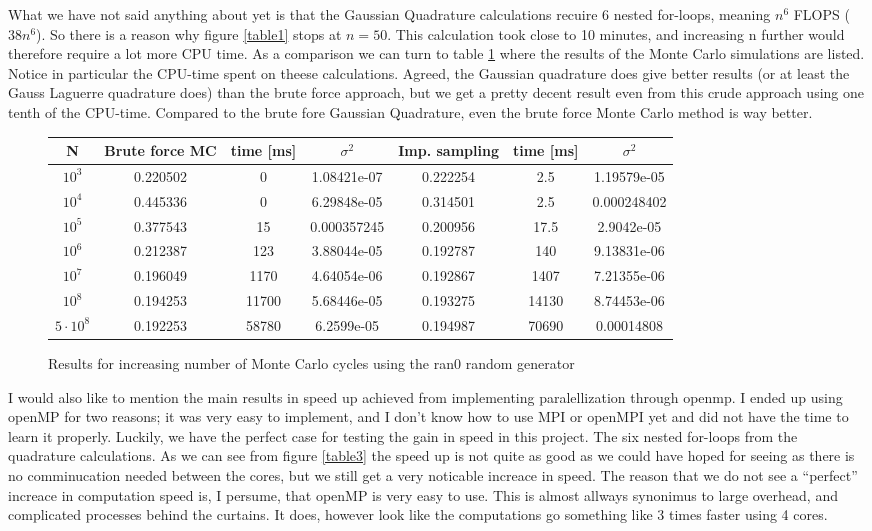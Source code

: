 \documentclass[a4paper,english, 10pt, twoside]{article}
\begin{document}
What we have not said anything about yet is that the Gaussian Quadrature calculations recuire 6 nested for-loops, meaning $n^6$ 
FLOPS ($38n^6$). So there is a reason why figure \ref{table1} stops at $n = 50$. This calculation took close to 10 minutes, and increasing n 
further would therefore require a lot more CPU time.  As a comparison we can turn to table \ref{table2} where the results of the 
Monte Carlo simulations are listed. Notice in particular the CPU-time spent on theese calculations. Agreed, the Gaussian quadrature 
does give better results (or at least the Gauss Laguerre quadrature does) than the brute force approach, but we get a pretty decent 
result even from this crude approach using one tenth of the CPU-time. Compared to the brute fore Gaussian Quadrature, even the 
brute force Monte Carlo method is way better.
\begin{figure}[H]
\centering 
\begin{tabular}{|c|c|c|c|c|c|c|}
\hline
N &Brute force MC & time [ms] &$\sigma^2$&Imp. sampling & time [ms]&$\sigma^2$ \\
\hline
$10^3$ & 0.220502 & 0 & 1.08421e-07& 0.222254 & 2.5 & 1.19579e-05 \\
$10^4$ & 0.445336 & 0 &6.29848e-05& 0.314501 & 2.5 & 0.000248402  \\
$10^5$ & 0.377543 & 15 & 0.000357245& 0.200956 & 17.5 & 2.9042e-05 \\
$10^6$ & 0.212387 & 123 & 3.88044e-05& 0.192787 & 140 & 9.13831e-06 \\
$10^7$ & 0.196049 & 1170 & 4.64054e-06& 0.192867 & 1407 & 7.21355e-06 \\
$10^8$ & 0.194253 & 11700 & 5.68446e-05& 0.193275 & 14130 & 8.74453e-06 \\
$5\cdot10^8$ & 0.192253 & 58780 & 6.2599e-05& 0.194987 & 70690 & 0.00014808\\
\hline
\end{tabular}
\caption{Results for increasing number of Monte Carlo cycles using the ran0 random generator}
\label{table2}
\end{figure}

I would also like to mention the main results in speed up achieved from implementing paralellization through openmp. I ended up 
using openMP for two reasons; it was very easy to implement, and I don't know how to use MPI or openMPI yet and did not have the 
time to learn it properly. Luckily, we have the 
perfect case for testing the gain in speed in this project. The six nested for-loops from the quadrature calculations. As we can 
see from figure \ref{table3} the speed up is not quite as good as we could have hoped for seeing as there is no comminucation 
needed between the cores, but we still get a very noticable increace in speed. The reason that we do not see a ``perfect'' increace 
in computation speed is, I persume, that openMP is very easy to use. This is almost allways synonimus to large overhead, and 
complicated processes behind the curtains. It does, however look like the computations go something like 3 times faster using 
4 cores. 
\end{document}
